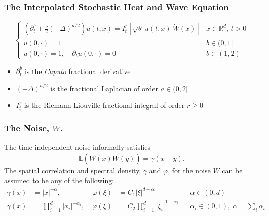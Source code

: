 \documentclass{beamer}%
\numberwithin{equation}{section}
\newcommand{\R}{\mathbb{R}}
\begin{document}
	\begin{frame}[t]%
		\frametitle{The Interpolated Stochastic Heat and Wave Equation}
		\begin{equation}
		\tag{\footnotesize ISHWE}
		\begin{cases}
		\left(\partial^b_t + \frac{\nu}{2}(-\Delta)^{a/2}\right) u(t,x) = I^r_t \left[\sqrt{\theta}\: u(t,x)\: \dot W(x) \right] & \text{$x\in \R^d$, $t>0$} \\
		u(0,\cdot) = 1                                                                                                           & b \in (0,1]               \\
		u(0,\cdot) = 1, \quad \partial_t u(0,\cdot) = 0                                                                          & b \in (1,2)
		\end{cases}
		\end{equation}
		
		\vfill
		\begin{itemize}
			\item $\partial^b_t$ is the {\it Caputo} fractional derivative
			\bigskip
			\item $(-\Delta)^{a/2}$ is the fractional Laplacian of order $a \in (0,2]$
			\bigskip
			\item $I^r_t$ is the Riemann-Liouville fractional integral of order $r \ge 0$
		\end{itemize}
		
	\end{frame}%
	
	
	
	\begin{frame}[t]%
		
		\frametitle{The Noise, $\dot{W}$.}
		The time independent noise informally satisfies
		\[
		\mathbb{E}(\dot{W}(x)\dot{W}(y)) = \gamma(x-y).
		\]
		The spatial correlation and spectral density, $\gamma$ and $\varphi$, for the noise $\dot{W}$ can be assumed to be any of the following:
		\bigskip
		\begin{align*}
		\gamma(x) & = |x|^{-\alpha}, \;                     & \varphi(\xi) & =C_1 |\xi|^{d-\alpha}                     &  & \alpha \in (0,d) \\[1em]
		\gamma(x) & = \prod_{i=1}^d |x_{i}|^{-\alpha_i}, \; & \varphi(\xi) & = C_2\prod_{i=1}^d |\xi_{i}|^{1-\alpha_i} &  & \alpha_i \in (0,1),\: \alpha = \sum_i\alpha_i
		\end{align*}
	\end{frame}%
	
\end{document}

